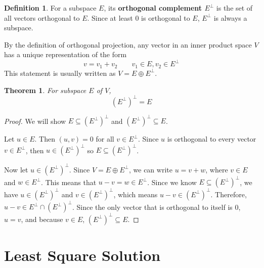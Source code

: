 \documentclass[a4paper,10pt]{book}
\theoremstyle{plain}
\newtheorem{theorem}{Theorem}[section]
\theoremstyle{plain}
\theoremstyle{remark}
\theoremstyle{definition}
\newtheorem{definition}{Definition}[section]
\begin{document}
\begin{definition}
For a subspace $E$, its \textbf{orthogonal complement $E^{\perp}$} is the set of all vectors orthogonal to $E$. Since at least 0 is orthogonal to $E$, $E^{\perp}$ is always a subspace. 
\end{definition}

By the definition of orthogonal projection, any vector in an inner product space $V$ has a unique representation of the form 
$$v = v_{1} + v_{2} \qquad v_{1} \in E, v_{2} \in E^{\perp}$$
This statement is usually written as $V = E \oplus E^{\perp}$.

\begin{theorem}
For subspace $E$ of $V$, 
$$(E^{\perp})^{\perp} = E$$
\end{theorem}

\begin{proof}
We will show $E \subseteq (E^{\perp})^{\perp}$ and $(E^{\perp})^{\perp} \subseteq E$.

Let $u \in E$. Then $(u, v) = 0$ for all $v \in E^{\perp}$. Since $u$ is orthogonal to every vector $v \in E^{\perp}$, then $u \in (E^{\perp})^{\perp}$ so $E \subseteq (E^{\perp})^{\perp}$. 

Now let $u \in (E^{\perp})^{\perp}$. Since $V = E \oplus E^{\perp}$, we can write $u = v + w$, where $v \in E$ and $w \in E^{\perp}$. This means that $u - v = w \in E^{\perp}$. Since we know $E \subseteq (E^{\perp})^{\perp}$, we have $u \in  (E^{\perp})^{\perp}$ and $v \in (E^{\perp})^{\perp}$, which means $u - v \in  (E^{\perp})^{\perp}$. Therefore, $u - v \in E^{\perp} \cap (E^{\perp})^{\perp}$. Since the only vector that is orthogonal to itself is 0, $u = v$, and because $v \in E$, $(E^{\perp})^{\perp} \subseteq E$. 
\end{proof}

\section{Least Square Solution} 
\end{document}
